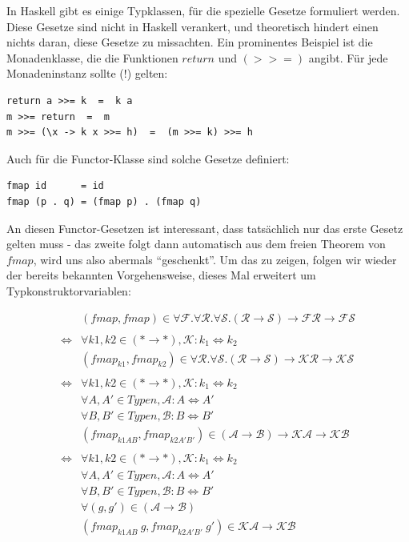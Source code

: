 \documentclass[11pt]{article} %
\begin{document}
In Haskell gibt es einige Typklassen, für die spezielle Gesetze formuliert werden. Diese Gesetze sind nicht in Haskell
verankert, und theoretisch hindert einen nichts daran, diese Gesetze zu missachten. Ein prominentes Beispiel ist die
Monadenklasse, die die Funktionen $return$ und $(>>=)$ angibt. Für jede Monadeninstanz sollte (!) gelten:

\begin{verbatim}
return a >>= k  =  k a
m >>= return  =  m
m >>= (\x -> k x >>= h)  =  (m >>= k) >>= h
\end{verbatim}

Auch für die Functor-Klasse sind solche Gesetze definiert:

\begin{verbatim}
fmap id      = id
fmap (p . q) = (fmap p) . (fmap q)
\end{verbatim}

An diesen Functor-Gesetzen ist interessant, dass tatsächlich nur das erste Gesetz gelten muss - das zweite folgt dann automatisch
aus dem freien Theorem von $fmap$, wird uns also abermals ``geschenkt''. Um das zu zeigen, folgen wir wieder der bereits bekannten Vorgehensweise, dieses Mal erweitert um Typkonstruktorvariablen:

\begin{align*}
&(fmap, fmap) \in \forall \mathcal{F} . \forall \mathcal{R} . \forall \mathcal{S} . (\mathcal{R} \rightarrow \mathcal{S})
\rightarrow \mathcal{F} \mathcal{R} \rightarrow \mathcal{F} \mathcal{S} \\
&\\
\Leftrightarrow &
\forall k1, k2 \in (* \rightarrow *), \mathcal{K} : k_1 \Leftrightarrow k_2 \\
&(fmap_{k1}, fmap_{k2}) \in \forall \mathcal{R} . \forall \mathcal{S} . (\mathcal{R} \rightarrow \mathcal{S}) \rightarrow
\mathcal{K} \mathcal{R} \rightarrow \mathcal{K} \mathcal{S} \\
&\\
\Leftrightarrow &
\forall k1, k2 \in (* \rightarrow *), \mathcal{K} : k_1 \Leftrightarrow k_2 \\
&\forall A, A' \in Typen, \mathcal{A} : A \Leftrightarrow A' \\
&\forall B, B' \in Typen, \mathcal{B} : B \Leftrightarrow B' \\
&(fmap_{k1 A B}, fmap_{k2 A' B'}) \in (\mathcal{A} \rightarrow \mathcal{B}) \rightarrow
\mathcal{K} \mathcal{A} \rightarrow \mathcal{K} \mathcal{B} \\
&\\
\Leftrightarrow &
\forall k1, k2 \in (* \rightarrow *), \mathcal{K} : k_1 \Leftrightarrow k_2 \\
&\forall A, A' \in Typen, \mathcal{A} : A \Leftrightarrow A' \\
&\forall B, B' \in Typen, \mathcal{B} : B \Leftrightarrow B' \\
&\forall (g, g') \in (\mathcal{A} \rightarrow \mathcal{B}) \\
&(fmap_{k1 A B}\ g, fmap_{k2 A' B'}\ g') \in \mathcal{K} \mathcal{A} \rightarrow \mathcal{K} \mathcal{B} \\
\end{align*}
\end{document}
